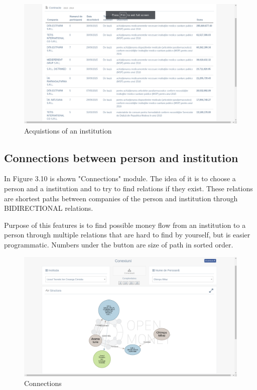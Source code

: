 \documentclass[12pt,a4paper,titlepage]{article}
\begin{document}
	\begin{figure}[!ht] 
	\renewcommand\thefigure{3.9} %
	\centering 
	\includegraphics[width=17cm]{icontracts.png} 
	\caption{ Acquistions of an institution }\label{fig4} 
	\end{figure}
	
		\newpage
\subsection{Connections between person and institution}

In Figure 3.10 is shown "Connections" module. The idea of it is to choose a person and a institution and to try to find relations if they exist. These relations are shortest paths between companies of the person and institution through BIDIRECTIONAL relations.

Purpose of this features is to find possible money flow from an institution to a person through multiple relations that are hard to find by yourself, but is easier programmatic. Numbers under the button are size of path in sorted order.

	\begin{figure}[!ht] 
	\renewcommand\thefigure{3.10} %
	\centering 
	\includegraphics[width=17cm]{connections.png} 
	\caption{ Connections }\label{fig4} 
	\end{figure}
	
\end{document}
